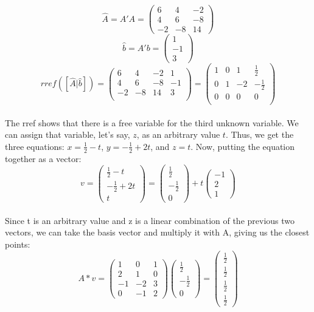 \documentclass{article}
\begin{document}
\[
\hat{A} = A'A = 
\begin{pmatrix}
6 & 4 & -2\\
4 & 6 & -8\\
-2 & -8 & 14
\end{pmatrix}
\]
\[
\hat{b} = A'b = 
\begin{pmatrix}
1\\
-1\\
3
\end{pmatrix}
\]
\[
rref([\hat{A} | \hat{b}]) = 
\left( \begin{array}{ccc|c}
6 & 4 & -2 & 1 \\
4 & 6 & -8 & -1 \\
-2 & -8 & 14 & 3 \\
\end{array} \right) = 
\left( \begin{array}{ccc|c}
1 & 0 & 1 & \frac{1}{2} \\
0 & 1 & -2 & -\frac{1}{2} \\
0 & 0 & 0 & 0 \\
\end{array} \right)
\]\\
The rref shows that there is a free variable for the third unknown variable. We can assign that variable, let's say, $z$, as an arbitrary value $t$. Thus, we get the three equations: $x = \frac{1}{2} - t$, $y = -\frac{1}{2} + 2t$, and $z = t$. Now, putting the equation together as a vector:\\
\[
v = 
\begin{pmatrix}
\frac{1}{2} - t\\
-\frac{1}{2} +2t\\
t
\end{pmatrix} = 
\begin{pmatrix}
\frac{1}{2}\\
-\frac{1}{2}\\
0
\end{pmatrix} + t
\begin{pmatrix}
-1\\
2\\
1
\end{pmatrix}
\]\\
Since t is an arbitrary value and z is a linear combination of the previous two vectors, we can take the basis vector and multiply it with A, giving us the closest points:
\[
A * v = 
\begin{pmatrix}
1 & 0 & 1\\
2 & 1 & 0\\
-1 & -2 & 3\\
0 & -1 & 2
\end{pmatrix}
\begin{pmatrix}
\frac{1}{2}\\
-\frac{1}{2}\\
0
\end{pmatrix} = 
\begin{pmatrix}
\frac{1}{2} \\
\frac{1}{2} \\
\frac{1}{2} \\
\frac{1}{2}
\end{pmatrix}
\]\\
\end{document}
